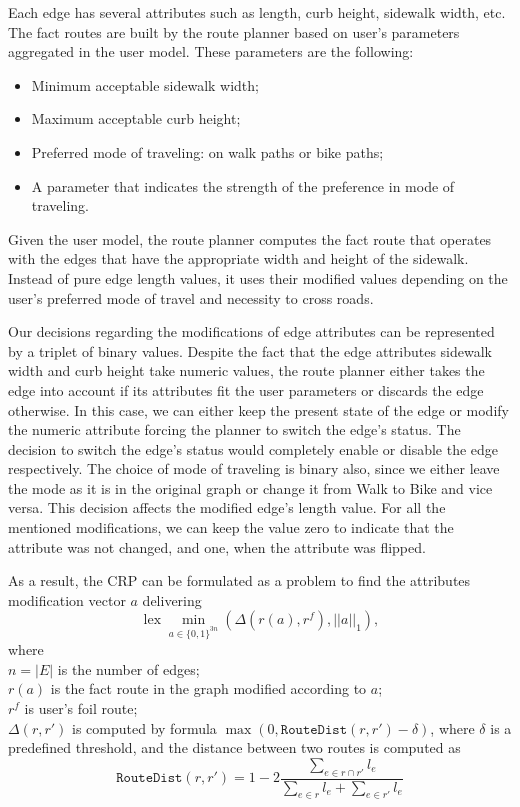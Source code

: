 \documentclass{article}
\DeclareMathOperator{\lex}{lex}
\begin{document}
Each edge has several attributes such as length, curb height, sidewalk width, etc. 
The fact routes are built by the route planner based on user's parameters aggregated in the user model. 
These parameters are the following: 
\begin{itemize}
    \item Minimum acceptable sidewalk width;
    \item Maximum acceptable curb height;
    \item Preferred mode of traveling: on walk paths or bike paths;
    \item A parameter that indicates the strength of the preference in mode of traveling.
\end{itemize}
Given the user model, the route planner computes the fact route that operates with the edges that have the appropriate width and height of the sidewalk.
Instead of pure edge length values, it uses their modified values depending on the user's preferred mode of travel and necessity to cross roads.

Our decisions regarding the modifications of edge attributes can be represented by a triplet of binary values.
Despite the fact that the edge attributes sidewalk width and curb height take numeric values, the route planner either takes the edge into account if its attributes fit the user parameters or discards the edge otherwise. 
In this case, we can either keep the present state of the edge or modify the numeric attribute forcing the planner to switch the edge's status.
The decision to switch the edge's status would completely enable or disable the edge respectively.
The choice of mode of traveling is binary also, since we either leave the mode as it is in the original graph or change it from Walk to Bike and vice versa.
This decision affects the modified edge's length value.
For all the mentioned modifications, we can keep the value zero to indicate that the attribute was not changed, and one, when the attribute was flipped. 

As a result, the CRP can be formulated as a problem to find the attributes modification vector $a$ delivering $$\lex\min_{a\in \{0,1\}^{3n}} \left(\Delta(r(a), r^f), ||a||_1\right),$$ where\\
$n = |E|$ is the number of edges;\\
$r(a)$ is the fact route in the graph modified according to $a$;\\
$r^f$ is user's foil route;\\
$\Delta(r,r')$ is computed by formula $\max(0, \mathtt{RouteDist}(r, r') - \delta)$, where $\delta$ is a predefined threshold, and the distance between two routes is computed as
$$
\mathtt{RouteDist}(r,r') = 1 - 2\frac{\sum_{e\in r\cap r'} l_e}{\sum_{e\in r}l_e + \sum_{e\in r'} l_e}
$$
\end{document}
